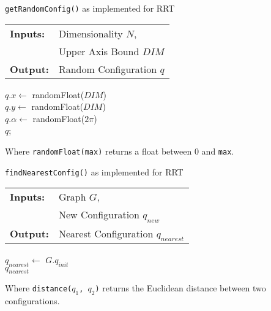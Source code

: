 
\bigskip
\begin{algorithm}[H]
    \caption{\texttt{getRandomConfig()} as implemented for \gls{RRT}}
    \SetAlgoLined
    \begin{tabular}{l l}
    \textbf{Inputs:}    & Dimensionality $N$,\\ 
                        & Upper Axis Bound $DIM$ \\
    \textbf{Output:}    & Random Configuration $q$ \\
    \end{tabular}

        $q.x \leftarrow$ randomFloat($DIM$) \\
        $q.y \leftarrow$ randomFloat($DIM$) \\
        $q.\alpha \leftarrow$ randomFloat($2\pi$) \\
        \Return $q$;\\
\end{algorithm}
\bigskip
Where \texttt{randomFloat(max)} returns a float between 0 and \texttt{max}.

\bigskip
\begin{algorithm}[H]
    \caption{\texttt{findNearestConfig()} as implemented for \gls{RRT}}
    \SetAlgoLined
    \begin{tabular}{l l}
    \textbf{Inputs:}    & Graph $G$, \\
                        & New Configuration $q_{new}$ \\
    \textbf{Output:}    & Nearest Configuration $q_{nearest}$ \\
    \end{tabular}

        $q_{nearest} \leftarrow$ $G$.$q_{init}$ \\
        \Return $q_{nearest}$ \\
\end{algorithm}
\bigskip
Where \texttt{distance($q_1$, $q_2$)} returns the Euclidean distance between two configurations.

